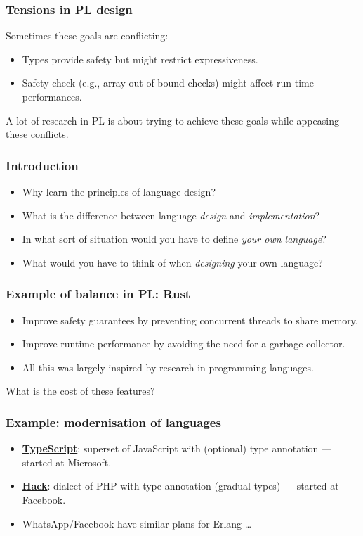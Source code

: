 \begin{frame}
  \frametitle{Tensions in PL design}
  Sometimes these goals are conflicting:
  \begin{itemize}
  \item Types provide safety but might restrict expressiveness.
  \item Safety check (e.g., array out of bound checks) might affect
    run-time performances.
  \end{itemize}

  \bigskip
  
  A lot of research in PL is about trying to achieve these goals while
  appeasing these conflicts.
\end{frame}




\begin{frame}
  \frametitle{Introduction}
  \begin{itemize}
  \item Why learn the principles of language design?
  \item What is the difference between language \emph{design} and \emph{implementation}?
  \item In what sort of situation would you have to define \emph{your own
    language}?
  \item What would you have to think of when \emph{designing} your
    own language?
  \end{itemize}
\end{frame}




\begin{frame}
  \frametitle{Example of balance in PL: Rust}
 
  \begin{itemize}
  \item Improve safety guarantees by preventing concurrent threads to
    share memory.
  \item Improve runtime performance by avoiding the need for a garbage
    collector.
  \item All this was largely inspired by research in programming languages.
  \end{itemize}

  \bigskip
  \pause
  What is the cost of these features?
  
\end{frame}


\begin{frame}
  \frametitle{Example: modernisation of languages}
  \begin{itemize}[<+->]
  \item \textbf{\href{https://www.typescriptlang.org/}{TypeScript}}: superset
    of JavaScript with (optional) type annotation --- started at Microsoft.
  \item \textbf{\href{https://hacklang.org/}{Hack}}: dialect of PHP with type
    annotation (gradual types) --- started at Facebook.
  \item WhatsApp/Facebook have similar plans for Erlang \ldots
  \end{itemize}
\end{frame}

